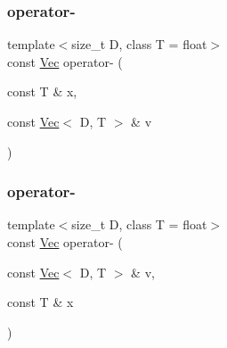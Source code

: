 \mbox{\label{classtrimesh_1_1Vec_a27d9ec4dc90e0b49a5a17eab7e637834}} 
\subsubsection{\texorpdfstring{operator-\/}{operator-}\hspace{0.1cm}{\footnotesize\ttfamily [1/2]}}
{\footnotesize\ttfamily template$<$size\+\_\+t D, class T = float$>$ \\
const \hyperlink{classtrimesh_1_1Vec}{Vec} operator-\/ (\begin{DoxyParamCaption}\item[{const T \&}]{x,  }\item[{const \hyperlink{classtrimesh_1_1Vec}{Vec}$<$ D, T $>$ \&}]{v }\end{DoxyParamCaption})\hspace{0.3cm}{\ttfamily [friend]}}

\mbox{\label{classtrimesh_1_1Vec_a61e303a5a0aa76761b8f7fa19b6e21b0}} 
\subsubsection{\texorpdfstring{operator-\/}{operator-}\hspace{0.1cm}{\footnotesize\ttfamily [2/2]}}
{\footnotesize\ttfamily template$<$size\+\_\+t D, class T = float$>$ \\
const \hyperlink{classtrimesh_1_1Vec}{Vec} operator-\/ (\begin{DoxyParamCaption}\item[{const \hyperlink{classtrimesh_1_1Vec}{Vec}$<$ D, T $>$ \&}]{v,  }\item[{const T \&}]{x }\end{DoxyParamCaption})\hspace{0.3cm}{\ttfamily [friend]}}

\mbox{\label{classtrimesh_1_1Vec_abbf885c9e1540fbd51fcf96c4672c091}} 
